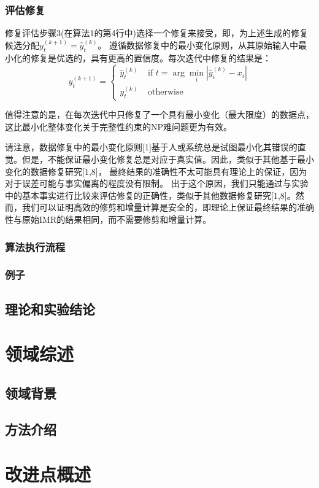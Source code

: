 \documentclass[12pt,a4paper]{article}
\begin{document}
\subsubsection{评估修复}
修复评估步骤3(在算法1的第4行中)选择一个修复来接受，即，为上述生成的修复候选分配$y_{t}^{(k+1)}=\hat{y}_{t}^{(k)}$。
遵循数据修复中的最小变化原则，从其原始输入中最小化的修复是优选的，具有更高的置信度。每次迭代中修复的结果是：
$$
y_{t}^{(k+1)}=\left\{\begin{array}{ll}{\hat{y}_{t}^{(k)}} & {\text { if } t=\arg \min _{i}\left|\hat{y}_{i}^{(k)}-x_{i}\right|} \\ {y_{t}^{(k)}} & {\text { otherwise }}\end{array}\right.
$$
\par
值得注意的是，在每次迭代中只修复了一个具有最小变化（最大限度）的数据点，这比最小化整体变化关于完整性约束的NP难问题更为有效。
\par
请注意，数据修复中的最小变化原则[1]基于人或系统总是试图最小化其错误的直觉。但是，不能保证最小变化修复总是对应于真实值。因此，类似于其他基于最小变化的数据修复研究[1,8]，
最终结果的准确性不太可能具有理论上的保证，因为对于误差可能与事实偏离的程度没有限制。
出于这个原因，我们只能通过与实验中的基本事实进行比较来评估修复的正确性，类似于其他数据修复研究[1,8]。然而，我们可以证明高效的修剪和增量计算是安全的，即理论上保证最终结果的准确性与原始IMR的结果相同，而不需要修剪和增量计算。
\subsubsection{算法执行流程}
\subsubsection{例子}
\subsection{理论和实验结论}
\section{领域综述}
\subsection{领域背景}
\subsection{方法介绍}
\section{改进点概述}
\end{document}
